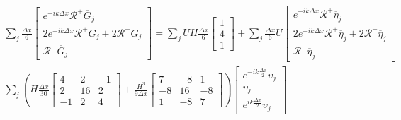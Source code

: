 \begin{multline*}
\sum_j \frac{\Delta x}{6} \begin{bmatrix} e^{-ik\Delta x} \mathcal{R}^+ \overline{G}_{j} \\2 e^{-ik\Delta x} \mathcal{R}^+\overline{G}_{j} +2 \mathcal{R}^- \overline{G}_{j}\\ \mathcal{R}^- \overline{G}_{j} \end{bmatrix} =   \sum_jUH \frac{\Delta x}{6}\begin{bmatrix} 1 \\4 \\ 1 \end{bmatrix} +  \sum_j \frac{\Delta x}{6} U \begin{bmatrix} e^{-ik\Delta x} \mathcal{R}^+ \overline{\eta}_{j} \\2 e^{-ik\Delta x} \mathcal{R}^+\overline{\eta}_{j} +2 \mathcal{R}^- \overline{\eta}_{j}\\ \mathcal{R}^- \overline{\eta}_{j} \end{bmatrix}  \\\sum_j \left(H\frac{\Delta x}{30}\begin{bmatrix} 4 &2 &-1 \\2 &16 &2  \\-1 &2 &4 \end{bmatrix} + \frac{H^3 }{9\Delta x}\begin{bmatrix} 7 &-8 &1  \\-8 &16 &-8  \\1 &-8 &7  \end{bmatrix} \right) \begin{bmatrix} e^{-ik\frac{\Delta x}{2}}\upsilon_{j} \\\upsilon_{j} \\ e^{ik\frac{\Delta x}{2}}\upsilon_{j} \end{bmatrix}
\end{multline*}
